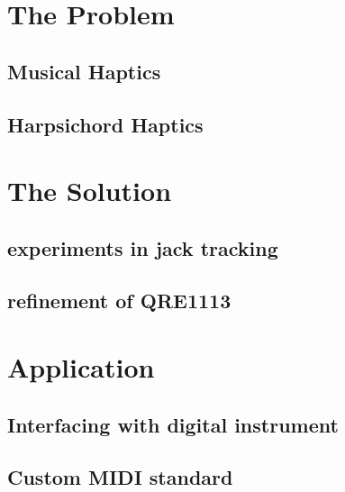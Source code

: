 \section{The Problem}\label{the-problem-3}

\subsection{Musical Haptics}\label{musical-haptics}

\subsection{Harpsichord Haptics}\label{harpsichord-haptics}

\section{The Solution}\label{the-solution-2}

\subsection{experiments in jack tracking}\label{experiments-in-jack-tracking}

\subsection{refinement of QRE1113}\label{refinement-of-qre1113}

\section{Application}\label{application-2}

\subsection{Interfacing with digital instrument}\label{interfacing-with-digital-instrument}

\subsection{Custom MIDI standard}\label{custom-midi-standard}


